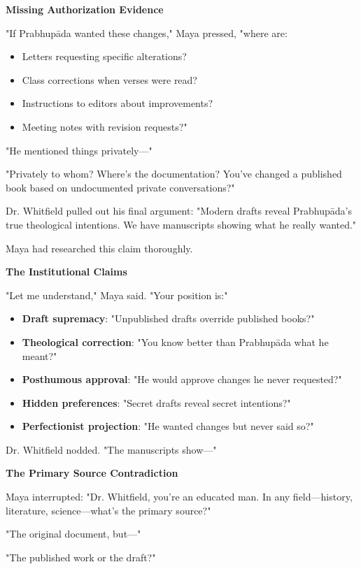 \documentclass[12pt,twoside]{book}
\begin{document}
\textbf{\textbf{Missing Authorization Evidence}}

"If Prabhupāda wanted these changes," Maya pressed, "where are:
\begin{itemize}
\item Letters requesting specific alterations?
\item Class corrections when verses were read?
\item Instructions to editors about improvements?
\item Meeting notes with revision requests?"
\end{itemize}

"He mentioned things privately—"

"Privately to whom? Where's the documentation? You've changed a published book based on undocumented private conversations?"

Dr. Whitfield pulled out his final argument: "Modern drafts reveal Prabhupāda's true theological intentions. We have manuscripts showing what he really wanted."

Maya had researched this claim thoroughly.

\textbf{\textbf{The Institutional Claims}}

"Let me understand," Maya said. "Your position is:"

\begin{itemize}
\item \textbf{\textbf{Draft supremacy}}: "Unpublished drafts override published books?"
\item \textbf{\textbf{Theological correction}}: "You know better than Prabhupāda what he meant?"
\item \textbf{\textbf{Posthumous approval}}: "He would approve changes he never requested?"
\item \textbf{\textbf{Hidden preferences}}: "Secret drafts reveal secret intentions?"
\item \textbf{\textbf{Perfectionist projection}}: "He wanted changes but never said so?"
\end{itemize}

Dr. Whitfield nodded. "The manuscripts show—"

\textbf{\textbf{The Primary Source Contradiction}}

Maya interrupted: "Dr. Whitfield, you're an educated man. In any field—history, literature, science—what's the primary source?"

"The original document, but—"

"The published work or the draft?"
\end{document}
